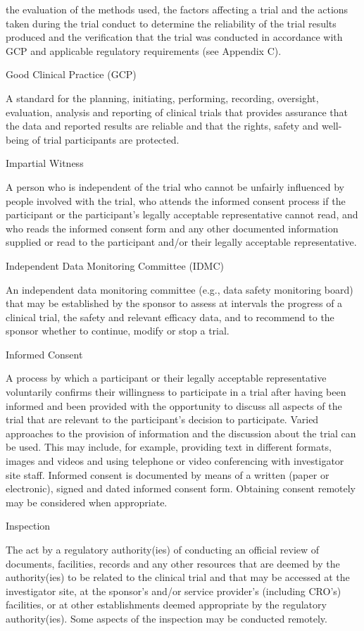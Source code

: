 \documentclass[11pt]{article}
\begin{document}
the evaluation of the methods used, the factors affecting a trial and the actions taken during the trial conduct to determine the reliability of the trial results produced and the verification that the trial was conducted in accordance with GCP and applicable regulatory requirements (see Appendix C).


Good Clinical Practice (GCP)


A standard for the planning, initiating, performing, recording, oversight, evaluation, analysis and reporting of clinical trials that provides assurance that the data and reported results are reliable and that the rights, safety and well-being of trial participants are protected.


Impartial Witness


A person who is independent of the trial who cannot be unfairly influenced by people involved with the trial, who attends the informed consent process if the participant or the participant's legally acceptable representative cannot read, and who reads the informed consent form and any other documented information supplied or read to the participant and/or their legally acceptable representative.


Independent Data Monitoring Committee (IDMC)


An independent data monitoring committee (e.g., data safety monitoring board) that may be established by the sponsor to assess at intervals the progress of a clinical trial, the safety and relevant efficacy data, and to recommend to the sponsor whether to continue, modify or stop a trial.


Informed Consent


A process by which a participant or their legally acceptable representative voluntarily confirms their willingness to participate in a trial after having been informed and been provided with the opportunity to discuss all aspects of the trial that are relevant to the participant's decision to participate. Varied approaches to the provision of information and the discussion about the trial can be used. This may include, for example, providing text in different formats, images and videos and using telephone or video conferencing with investigator site staff. Informed consent is documented by means of a written (paper or electronic), signed and dated informed consent form. Obtaining consent remotely may be considered when appropriate.


Inspection


The act by a regulatory authority(ies) of conducting an official review of documents, facilities, records and any other resources that are deemed by the authority(ies) to be related to the clinical trial and that may be accessed at the investigator site, at the sponsor's and/or service provider's (including CRO's) facilities, or at other establishments deemed appropriate by the regulatory authority(ies). Some aspects of the inspection may be conducted remotely.
\end{document}
